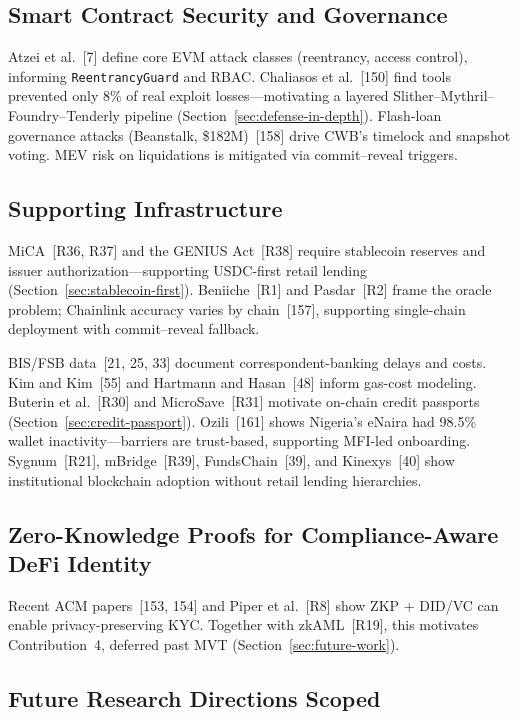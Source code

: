 \documentclass[12pt,a4paper]{report}
\begin{document}
\subsection{Smart Contract Security and Governance}

Atzei et al.~[7] define core EVM attack classes (reentrancy, access control), informing \texttt{ReentrancyGuard} and RBAC. Chaliasos et al.~[150] find tools prevented only 8\% of real exploit losses---motivating a layered Slither--Mythril--Foundry--Tenderly pipeline (Section~\ref{sec:defense-in-depth}). Flash-loan governance attacks (Beanstalk, \$182M)~[158] drive CWB's timelock and snapshot voting. MEV risk on liquidations is mitigated via commit--reveal triggers.

\subsection{Supporting Infrastructure}
\label{sec:lit-stablecoin-reg}
\label{sec:lit-sbt}
\label{sec:lit-institutional}

MiCA~[R36, R37] and the GENIUS Act~[R38] require stablecoin reserves and issuer authorization---supporting USDC-first retail lending (Section~\ref{sec:stablecoin-first}). Beniiche~[R1] and Pasdar~[R2] frame the oracle problem; Chainlink accuracy varies by chain~[157], supporting single-chain deployment with commit--reveal fallback.

BIS/FSB data~[21, 25, 33] document correspondent-banking delays and costs. Kim and Kim~[55] and Hartmann and Hasan~[48] inform gas-cost modeling. Buterin et al.~[R30] and MicroSave~[R31] motivate on-chain credit passports (Section~\ref{sec:credit-passport}). Ozili~[161] shows Nigeria's eNaira had 98.5\% wallet inactivity---barriers are trust-based, supporting MFI-led onboarding. Sygnum~[R21], mBridge~[R39], FundsChain~[39], and Kinexys~[40] show institutional blockchain adoption without retail lending hierarchies.

\subsection{Zero-Knowledge Proofs for Compliance-Aware DeFi Identity}
\label{sec:lit-zkp-defi}

Recent ACM papers~[153, 154] and Piper et al.~[R8] show ZKP + DID/VC can enable privacy-preserving KYC. Together with zkAML~[R19], this motivates Contribution~4, deferred past MVT (Section~\ref{sec:future-work}).

\subsection{Future Research Directions Scoped}
\label{sec:lit-gnn}
\label{sec:lit-fl}
\label{sec:lit-retail-payments}
\label{sec:lit-llm}
\label{sec:harness-lit}
\end{document}
